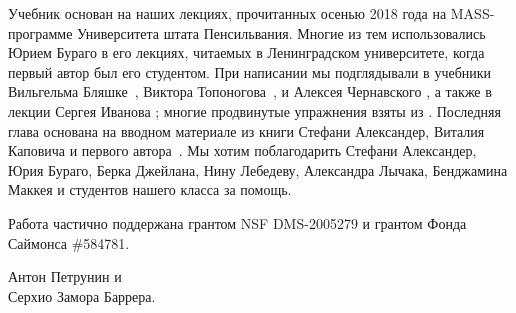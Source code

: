 Учебник основан на наших лекциях, прочитанных осенью 2018 года на MASS-программе Университета штата Пенсильвания.
Многие из тем использовались Юрием Бураго в его лекциях, читаемых в Ленинградском университете, когда первый автор был его студентом.
При написании мы подглядывали в учебники
Вильгельма Бляшке~\cite{blaschke},
Виктора Топоногова~\cite{toponogov-book},
и Алексея Чернавского \cite{chernavsky}, а также в лекции Сергея Иванова \cite{ivanov};
многие продвинутые упражнения взяты из \cite{petrunin2020}.
Последняя глава основана на вводном материале из книги Стефани Александер, Виталия Каповича и первого автора~\cite{alexander-kapovitch-petrunin2027}.
Мы хотим поблагодарить
Стефани Александер,
Юрия Бураго,
Берка Джейлана,
Нину Лебедеву,
Александра Лычака,
Бенджамина Маккея
и студентов нашего класса
за помощь.

Работа частично поддержана грантом NSF DMS-2005279 и грантом Фонда Саймонса  \#584781.

\begin{flushright}
Антон Петрунин и
\\
Серхио Замора Баррера.
\end{flushright}




